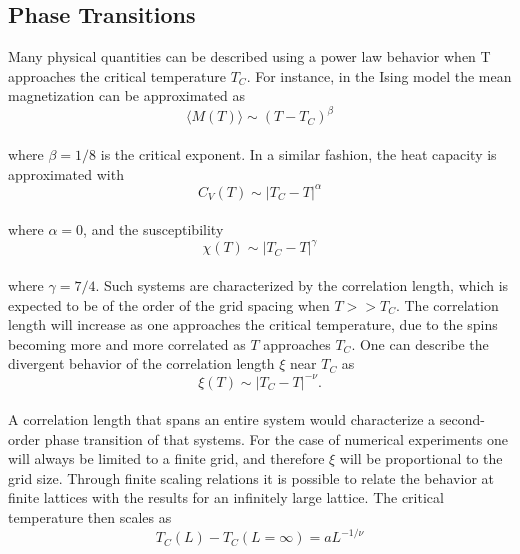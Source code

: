 \documentclass[%
reprint,nofootinbib,
amsmath,amssymb,
aps,
]{revtex4-1}
\begin{document}
\subsection*{Phase Transitions} \noindent 
Many physical quantities can be described using a power law behavior when T approaches the critical temperature $T_C$. For instance, in the Ising model the mean magnetization can be approximated as \\ 
\begin{equation}
\langle M(T) \rangle \sim \left(T-T_C\right)^{\beta}
\end{equation} \\ 
where $\beta=1/8$ is the critical exponent. In a similar fashion, the heat capacity is approximated with \\ 
\begin{equation}
C_V(T) \sim \left|T_C-T\right|^{\alpha}
\end{equation} \\ 
where $\alpha = 0$, and the susceptibility \\
\begin{equation}
\chi(T) \sim \left|T_C-T\right|^{\gamma}
\end{equation} \\
where $\gamma = 7/4$. Such systems are characterized by the correlation length, which is expected to be of the order of the grid spacing when  $T>> T_C$. The correlation length will increase as one approaches the critical temperature, due to the spins becoming more and more correlated as $T$ approaches $T_C$. One can describe the divergent behavior of the correlation length $\xi$ near $T_C$ as \\ 
\begin{equation}
\xi(T) \sim \left|T_C-T\right|^{-\nu}.
\label{eq:xi}
\end{equation}  \\ 
A correlation length that spans an entire system would characterize a second-order phase transition of that systems. For the case of numerical experiments one will always be limited to a finite grid, and therefore $\xi$ will be proportional to the grid size. Through finite scaling relations it is possible to relate the behavior at finite lattices with the results for an infinitely large lattice. The critical temperature then scales as \\
\begin{equation}
T_C(L)-T_C(L=\infty) = aL^{-1/\nu}
\label{eq:tc}
\end{equation}\\ 
\end{document}
